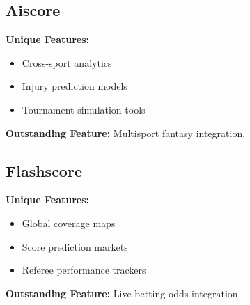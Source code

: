 \subsection{Aiscore}
\textbf{Unique Features:}
\begin{itemize}
    \item Cross-sport analytics
    \item Injury prediction models
    \item Tournament simulation tools
\end{itemize}
\textbf{Outstanding Feature:} Multisport fantasy integration\parencite{aiscore}.

\subsection{Flashscore}
\textbf{Unique Features:}
\begin{itemize}
    \item Global coverage maps
    \item Score prediction markets
    \item Referee performance trackers
\end{itemize}
\textbf{Outstanding Feature:} Live betting odds integration\parencite{flashscore}
